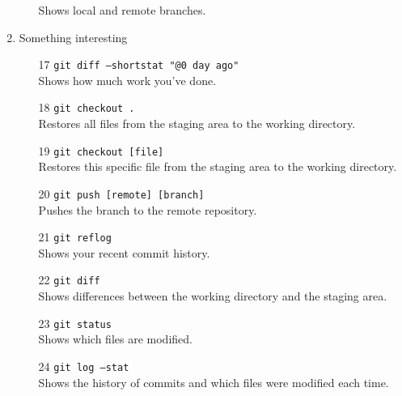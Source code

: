 \documentclass{article}
\begin{document}
\begin{enumerate}
\begin{itemize}
        Shows local and remote branches.  
    \end{itemize}  
    \item Something interesting  
    \begin{itemize}  
        \item[17] \texttt{git diff --shortstat "@{0 day ago}"} \\
        Shows how much work you've done.  
        \item[18] \texttt{git checkout .} \\
        Restores all files from the staging area to the working directory.  
        \item[19] \texttt{git checkout [file]} \\
        Restores this specific file from the staging area to the working directory.  
        \item[20] \texttt{git push [remote] [branch]} \\
        Pushes the branch to the remote repository.  
        \item[21] \texttt{git reflog} \\
        Shows your recent commit history.  
        \item[22] \texttt{git diff} \\
        Shows differences between the working directory and the staging area.  
        \item[23] \texttt{git status} \\
        Shows which files are modified.  
        \item[24] \texttt{git log --stat} \\
        Shows the history of commits and which files were modified each time.  
    \end{itemize}  
\end{enumerate}
\end{document}
